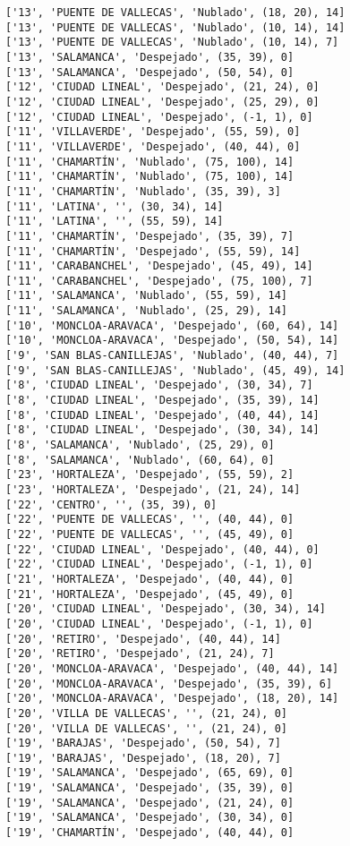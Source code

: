\documentclass[11pt]{article}
\begin{document}
\begin{Verbatim}[commandchars=\\\{\}]
['13', 'PUENTE DE VALLECAS', 'Nublado', (18, 20), 14]
['13', 'PUENTE DE VALLECAS', 'Nublado', (10, 14), 14]
['13', 'PUENTE DE VALLECAS', 'Nublado', (10, 14), 7]
['13', 'SALAMANCA', 'Despejado', (35, 39), 0]
['13', 'SALAMANCA', 'Despejado', (50, 54), 0]
['12', 'CIUDAD LINEAL', 'Despejado', (21, 24), 0]
['12', 'CIUDAD LINEAL', 'Despejado', (25, 29), 0]
['12', 'CIUDAD LINEAL', 'Despejado', (-1, 1), 0]
['11', 'VILLAVERDE', 'Despejado', (55, 59), 0]
['11', 'VILLAVERDE', 'Despejado', (40, 44), 0]
['11', 'CHAMARTÍN', 'Nublado', (75, 100), 14]
['11', 'CHAMARTÍN', 'Nublado', (75, 100), 14]
['11', 'CHAMARTÍN', 'Nublado', (35, 39), 3]
['11', 'LATINA', '', (30, 34), 14]
['11', 'LATINA', '', (55, 59), 14]
['11', 'CHAMARTÍN', 'Despejado', (35, 39), 7]
['11', 'CHAMARTÍN', 'Despejado', (55, 59), 14]
['11', 'CARABANCHEL', 'Despejado', (45, 49), 14]
['11', 'CARABANCHEL', 'Despejado', (75, 100), 7]
['11', 'SALAMANCA', 'Nublado', (55, 59), 14]
['11', 'SALAMANCA', 'Nublado', (25, 29), 14]
['10', 'MONCLOA-ARAVACA', 'Despejado', (60, 64), 14]
['10', 'MONCLOA-ARAVACA', 'Despejado', (50, 54), 14]
['9', 'SAN BLAS-CANILLEJAS', 'Nublado', (40, 44), 7]
['9', 'SAN BLAS-CANILLEJAS', 'Nublado', (45, 49), 14]
['8', 'CIUDAD LINEAL', 'Despejado', (30, 34), 7]
['8', 'CIUDAD LINEAL', 'Despejado', (35, 39), 14]
['8', 'CIUDAD LINEAL', 'Despejado', (40, 44), 14]
['8', 'CIUDAD LINEAL', 'Despejado', (30, 34), 14]
['8', 'SALAMANCA', 'Nublado', (25, 29), 0]
['8', 'SALAMANCA', 'Nublado', (60, 64), 0]
['23', 'HORTALEZA', 'Despejado', (55, 59), 2]
['23', 'HORTALEZA', 'Despejado', (21, 24), 14]
['22', 'CENTRO', '', (35, 39), 0]
['22', 'PUENTE DE VALLECAS', '', (40, 44), 0]
['22', 'PUENTE DE VALLECAS', '', (45, 49), 0]
['22', 'CIUDAD LINEAL', 'Despejado', (40, 44), 0]
['22', 'CIUDAD LINEAL', 'Despejado', (-1, 1), 0]
['21', 'HORTALEZA', 'Despejado', (40, 44), 0]
['21', 'HORTALEZA', 'Despejado', (45, 49), 0]
['20', 'CIUDAD LINEAL', 'Despejado', (30, 34), 14]
['20', 'CIUDAD LINEAL', 'Despejado', (-1, 1), 0]
['20', 'RETIRO', 'Despejado', (40, 44), 14]
['20', 'RETIRO', 'Despejado', (21, 24), 7]
['20', 'MONCLOA-ARAVACA', 'Despejado', (40, 44), 14]
['20', 'MONCLOA-ARAVACA', 'Despejado', (35, 39), 6]
['20', 'MONCLOA-ARAVACA', 'Despejado', (18, 20), 14]
['20', 'VILLA DE VALLECAS', '', (21, 24), 0]
['20', 'VILLA DE VALLECAS', '', (21, 24), 0]
['19', 'BARAJAS', 'Despejado', (50, 54), 7]
['19', 'BARAJAS', 'Despejado', (18, 20), 7]
['19', 'SALAMANCA', 'Despejado', (65, 69), 0]
['19', 'SALAMANCA', 'Despejado', (35, 39), 0]
['19', 'SALAMANCA', 'Despejado', (21, 24), 0]
['19', 'SALAMANCA', 'Despejado', (30, 34), 0]
['19', 'CHAMARTÍN', 'Despejado', (40, 44), 0]

\end{Verbatim}
\end{document}
